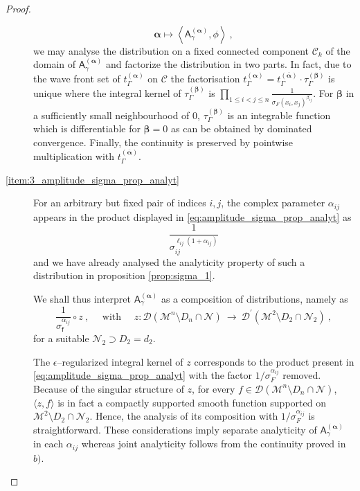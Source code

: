 \documentclass[11pt]{book}
\newcommand{\alphabd}{\boldsymbol{\alpha}}
\newcommand{\betabd}{\boldsymbol{\beta}}
\newcommand{\sm}[1]{\left\langle#1\right\rangle}
\newcommand{\Ccal}{\mathcal{C}}
\newcommand{\Dcal}{\mathcal{D}}
\newcommand{\Mcal}{\mathcal{M}}
\newcommand{\Ncal}{\mathcal{N}}
\newcommand{\Asf}{\mathsf{A}}
\newcommand{\fsf}{\mathsf{f}}
\theoremstyle{break}
\begin{document}
\begin{proof}
\begin{description}
{%
\begin{equation*}
\alphabd \mapsto \sm{ \Asf_\gamma^{(\alphabd)} , \phi } \ ,
\end{equation*}
%
we may analyse the distribution on a fixed connected component $\Ccal_k$ of the domain of $\Asf_\gamma^{(\alphabd)}$ and factorize the distribution in two parts. 
%
In fact, due to the wave front set of $t_\Gamma^{(\alphabd)}$ on $\mathcal{C}$ the factorisation $t_\Gamma^{(\alphabd)} =t_\Gamma^{(\overline{\alphabd})} \cdot \tau_\Gamma^{(\betabd)}$ is unique where the integral kernel of $\tau_\Gamma^{(\betabd)}$ is $\prod_{1\leq i < j \leq n } \frac{1}{\sigma_F(x_i,x_j)^{\beta_{ij}}}$.
For $\betabd$ in a sufficiently small neighbourhood of $0$, $\tau_\Gamma^{(\betabd)}$ is an integrable function which is differentiable for $\betabd=0$ as can be obtained by dominated convergence. Finally, the continuity is preserved by pointwise multiplication with $t_\Gamma^{(\overline{\alphabd})}$.
}
%
%
\item[\ref{item:3_amplitude_sigma_prop_analyt}]
For an arbitrary but fixed pair of indices $i,j$, the complex parameter $\alpha_{ij}$ appears in the product displayed in \eqref{eq:amplitude_sigma_prop_analyt} as 
%
\begin{equation*}
\frac{1}{\sigma_{ij}^{\ell_{ij}(1+\alpha_{ij})}} 
\end{equation*}
%
and we have already analysed the analyticity property of such a distribution in proposition \ref{prop:sigma_1}.\par 
We shall thus interpret $\Asf_\gamma^{(\alphabd)}$ as a composition of distributions, namely as 
%
\begin{equation*}
\frac{1}{\sigma_\fsf^{\alpha_{ij}}} \circ z \ , \quad \mbox{ with } \quad z : \Dcal(\Mcal^{n}\setminus D_{n}\cap \Ncal) \ \to \ \Dcal^\prime(\Mcal^{2}\setminus D_2\cap \Ncal_2) \ ,
\end{equation*}
%
for a suitable $\Ncal_2\supset D_2=d_2$. \par
%
The $\epsilon$--regularized integral kernel of $z$ corresponds to the product present in \eqref{eq:amplitude_sigma_prop_analyt} with the factor  $1/\sigma_F^{\alpha_{ij}}$ removed. Because of the singular structure of $z$, for every $f\in \Dcal(\Mcal^{n}\setminus D_{n}\cap \Ncal)$, $\langle z,f\rangle$ is in fact a compactly supported smooth function supported on $\Mcal^{2}\setminus D_2\cap \Ncal_2$. Hence, the analysis of its composition with $1/\sigma_F^{\alpha_{ij}}$ is straightforward. These considerations imply separate analyticity of $\Asf_\gamma^{(\alphabd)}$ in each $\alpha_{ij}$ whereas joint analyticity follows from the continuity proved in $b)$.
% 
\end{description}
\end{proof}
\end{document}
